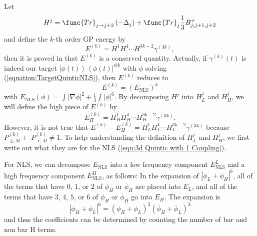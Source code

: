 \documentclass[12pt,letterpaper,leqno]{amsart}
\theoremstyle{plain}
\numberwithin{equation}{section}
\numberwithin{theorem}{section}
\numberwithin{proposition}{section}
\numberwithin{lemma}{section}
\numberwithin{corollary}{section}
\begin{document}
Let 
\begin{equation*}
H^{j}=\func{Tr}_{j\rightarrow j+2}\left( -\Delta _{j}\right) +\func{Tr}_{j}%
\frac{1}{3}B_{j;j+1,j+2}^{+}
\end{equation*}%
and define the $k$-th order GP energy by 
\begin{equation*}
E^{(k)}=H^{1}H^{4}\cdots H^{3k-2}\gamma ^{(3k)},
\end{equation*}%
then it is proved in \cite{TChenAndNP2} that $E^{(k)}$ is a conserved
quantity. Actually, if $\gamma ^{(k)}(t)$ is indeed our target $\left\vert
\phi (t)\right\rangle \left\langle \phi (t)\right\vert ^{\otimes k}$ with $%
\phi $ solving (\ref{equation:TargetQuinticNLS}), then $E^{(k)}$ reduces to 
\begin{equation*}
E^{(k)}=(E_{\text{NLS}})^{k}
\end{equation*}%
with $E_{\text{NLS}}(\phi )=\int |\nabla \phi |^{2}+\frac{1}{3}\int |\phi
|^{6}$. By decomposing $H^{j}$ into $H_{L}^{j}$ and $H_{H}^{j}$, we will
define the high piece of $E^{(k)}$ by 
\begin{equation*}
E_{H}^{(k)}=H_{H}^{1}H_{H}^{4}\cdots H_{H}^{3k-2}\gamma ^{(3k)}.
\end{equation*}%
However, it is not true that $E^{(k)}-E_{H}^{(k)}=H_{L}^{1}H_{L}^{4}\cdots
H_{L}^{3k-2}\gamma ^{(3k)}$ because $P_{\geqslant M}^{(k)}+$ $%
P_{<M}^{(k)}\neq 1$. To help understanding the definition of $H_{L}^{j}$ and 
$H_{H}^{j}$, we first write out what they are for the NLS (\ref{eqn:3d
Quintic with 1 Coupling}).

For NLS, we can decompose $E_{\text{NLS}}$ into a low frequency component $%
E_{\text{NLS}}^{L}$ and a high frequency component $E_{\text{NLS}}^{H}$, as
follows: In the expansion of $|\phi _{L}+\phi _{H}|^{6}$, all of the terms
that have $0$, $1$, or $2$ of $\phi _{H}$ or $\bar{\phi}_{H}$ are placed
into $E_{L}$, and all of the terms that have $3$, $4$, $5$, or $6$ of $\phi
_{H}$ or $\bar{\phi}_{H}$ go into $E_{H}$. The expansion is 
\begin{equation*}
|\phi _{H}+\phi _{L}|^{6}=(\phi _{H}+\phi _{L})^{3}(\bar{\phi}_{H}+\bar{\phi}%
_{L})^{3}
\end{equation*}%
and thus the coefficients can be determined by counting the number of bar
and non bar H terms.
\end{document}
